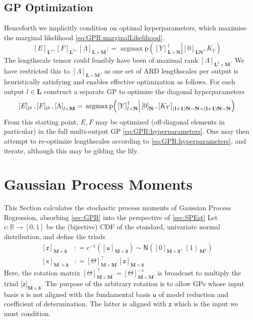\documentclass[preprint,12pt]{elsarticle}
\newcommand*{\M}[1]{\ensuremath{#1}\xspace}
\newcommand*{\x}{\times}
\newcommand*{\mi}[1]{\mathbf{#1}}
\newcommand*{\st}[1]{\mathbb{#1}}
\newcommand*{\rv}[1]{\mathsf{#1}}
\newcommand*{\te}[2][]{\left\lbrack{#2}\right\rbrack_{#1}}
\newcommand*{\tte}[2][]{\lbrack{#2}\rbrack_{#1}}
\newcommand*{\diag}[2][]{\left\langle{#2}\right\rangle_{#1}}
\newcommand*{\prob}[3]{\M{\mathrm{p}\!\left(\left.{#1}\right\vert{#2,#3}\right)}}
\newcommand*{\deq}{\M{\mathrel{\mathop:}=}}
\newcommand*{\gauss}[2]{\mathsf{N}\!\left({#1,#2}\right)}
\DeclareMathOperator*{\argmax}{argmax}
\begin{document}
    \subsection{GP Optimization} \label{sub:GPR:Optimization}
        Henceforth we implicitly condition on optimal hyperparameters, which maximise the marginal likelihood \cref{eq:GPR:marginalLikelihood}.
        \begin{equation} \label{eq:GPR:hyperparameters}
            \te[\mi{L}^{2}]{E},\te[\mi{L}^{2}]{F},\te[\mi{L}\x\mi{M}]{\Lambda} \deq \argmax \prob{\te[\mi{L\x N}]{Y}^{\dagger}}{\te[\mi{LN}]{0}}{K_Y}
        \end{equation}
        The lengthscale tensor could feasibly have been of maximal rank $\te[\mi{L}^{2}\x\mi{M}]{\Lambda}$. We have restricted this to $\te[\mi{L}\x\mi{M}]{\Lambda}$, as one set of ARD lengthscales per output is heuristically satisfying and enables effective optimization as follows.
        For each output $l \in \mi{L}$ construct a separate GP to optimize the diagonal hyperparameters
        \begin{equation*}
            \te[l^{2}]{E},\te[l^{2}]{F},\te[l\x\mi{M}]{\Lambda} = \\
            \argmax \prob{\te[l\x \mi{N}]{Y}^{\dagger}}{\te[\mi{N}]{0}}{\te[\mi{(l+1)N-N}\x\mi{(l+1)N-N}]{K_Y}}
        \end{equation*}
        From this starting point, $E,F$ may be optimized (off-diagonal elements in particular) in the full multi-output GP \cref{eq:GPR:hyperparameters}. One may then attempt to re-optimize lengthscales according to \cref{eq:GPR:hyperparameters}, and iterate, although this may be gilding the lily.


\section{Gaussian Process Moments}\label{sec:GPMom}
    This Section calculates the stochastic process moments of Gaussian Process Regression, absorbing \cref{sec:GPR} into the perspective of \cref{sec:SPEst}
    Let $c\colon \st{R} \to [0,1]$ be the (bijective) CDF of the standard, univariate normal distribution, and define the triads
    \begin{equation*}
        \begin{aligned}
            \te[\mi{M\x 3}]{\rv{z}} &\deq c^{-1}\!\left(\te[\mi{M\x 3}]
            {\rv{u}}\right) \sim \gauss{\te[\mi{M\x 3}]{0}}{\diag[\mi{M}^{2}]{1}} \\
            \te[\mi{M^{\prime}\x 3}]{\rv{x}} &\deq \te[\mi{M\x M^{\prime}}]{\Theta}^{\intercal} \te[\mi{M\x 3}]{\rv{z}}
        \end{aligned}
    \end{equation*}
    Here, the rotation matrix $\te[\mi{M\x M^{\prime}}]{\Theta}^{\intercal} = \te[\mi{M\x M^{\prime}}]{\Theta}^{-1}$ is broadcast to multiply the triad $\tte[\mi{M\x 3}]{\rv{z}}$. 
    The purpose of ths arbitrary rotation is to allow GPs whose input basis $\rv{x}$ is not aligned with the fundamental basis $\rv{u}$ of model reduction and coefficient of determination. The latter is aligned with $\rv{z}$ which is the input we must condition.
    
\end{document}
